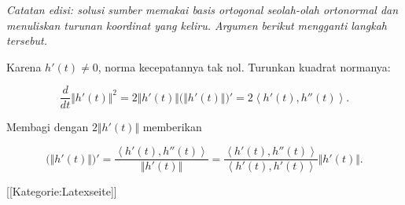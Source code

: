 
\textit{Catatan edisi: solusi sumber memakai basis ortogonal seolah-olah
ortonormal dan menuliskan turunan koordinat yang keliru. Argumen berikut
mengganti langkah tersebut.}

Karena $h'(t)\neq 0$, norma kecepatannya tak nol. Turunkan kuadrat normanya:

\[
\frac{d}{dt}\Vert h'(t)\Vert^2
=2\Vert h'(t)\Vert\bigl(\Vert h'(t)\Vert\bigr)'
=2\left\langle h'(t),h''(t)\right\rangle .
\]

Membagi dengan $2\Vert h'(t)\Vert$ memberikan

\[
\bigl(\Vert h'(t)\Vert\bigr)'
=\frac{\left\langle h'(t),h''(t)\right\rangle}{\Vert h'(t)\Vert}
=\frac{\left\langle h'(t),h''(t)\right\rangle}
       {\left\langle h'(t),h'(t)\right\rangle}\Vert h'(t)\Vert .
\]

 [[Kategorie:Latexseite]]
